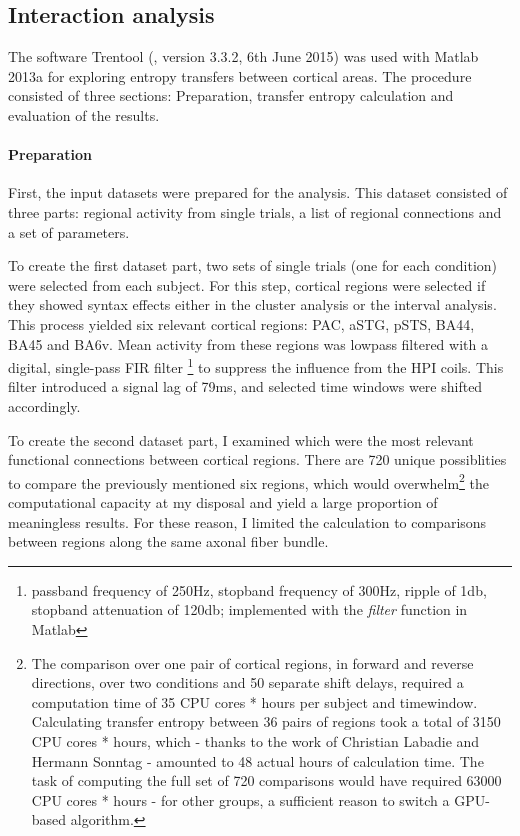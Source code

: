 \subsection{Interaction analysis}

The software Trentool (\cite{3.4.Trentool}, version 3.3.2, 6th June 2015) was used with Matlab 2013a for exploring entropy transfers between cortical areas.
The procedure consisted of three sections: Preparation, transfer entropy calculation and evaluation of the results.

\paragraph{Preparation}
First, the input datasets were prepared for the analysis.
This dataset consisted of three parts: regional activity from single trials, a list of regional connections and a set of parameters.

To create the first dataset part, two sets of single trials (one for each condition) were selected from each subject.
For this step, cortical regions were selected if they showed syntax effects either in the cluster analysis or the interval analysis.
This process yielded six relevant cortical regions: PAC, aSTG, pSTS, BA44, BA45 and BA6v.
Mean activity from these regions was lowpass filtered with a digital, single-pass FIR filter \footnote{passband frequency of 250Hz, stopband frequency of 300Hz, ripple of 1db, stopband attenuation of 120db; implemented with the \emph{filter} function in Matlab} to suppress the influence from the HPI coils.
This filter introduced a signal lag of 79ms, and selected time windows were shifted accordingly.

To create the second dataset part, I examined which were the most relevant functional connections between cortical regions.
There are 720 unique possiblities to compare the previously mentioned six regions, which would overwhelm\footnote{The comparison over one pair of cortical regions, in forward and reverse directions, over two conditions and 50 separate shift delays, required a computation time of 35 CPU cores * hours per subject and timewindow. Calculating transfer entropy between 36 pairs of regions took a total of 3150 CPU cores * hours, which - thanks to the work of Christian Labadie and Hermann Sonntag - amounted to 48 actual hours of calculation time. The task of computing the full set of 720 comparisons would have required 63000 CPU cores * hours - for other groups, a sufficient reason to switch a GPU-based algorithm\cite{3.4.gpuTE}.} the computational capacity at my disposal and yield a large proportion of meaningless results.
For these reason, I limited the calculation to comparisons between regions along the same axonal fiber bundle.

